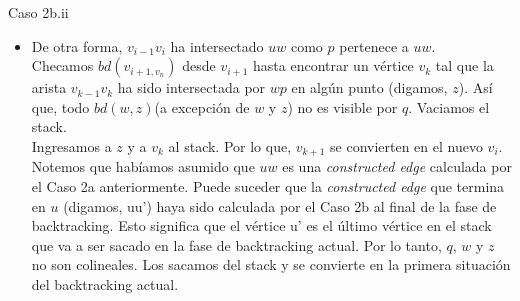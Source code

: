 \documentclass[aspectratio=169,xcolor=dvipsnames, t]{beamer}
\begin{document}
\begin{frame}{Caso 2b.ii}
    \begin{itemize}
        \small
        \item De otra forma, $v_{i-1}v_{i}$ ha intersectado $uw$ como $p$ pertenece a $uw$.\\
        \vspace{0.5cm}
        Checamos $bd(v_{i+1, v_{n}})$ desde $v_{i+1}$ hasta encontrar un vértice $v_{k}$ tal que la arista $v_{k-1}v_{k}$ ha sido intersectada por $wp$ en algún punto (digamos, $z$). Así que, todo $bd(w,z)$(a excepción de $w$ y $z$) no es visible por $q$. Vaciamos el stack.\\
        \vspace{0.5cm}
        Ingresamos a $z$ y a $v_{k}$ al stack. Por lo que, $v_{k+1}$ se convierten en el nuevo $v_{i}$. Notemos que habíamos asumido que $uw$ es una \textit{constructed edge} calculada por el Caso 2a anteriormente. Puede suceder que la \textit{constructed edge} que termina en $u$ (digamos, uu’) haya sido calculada por el Caso 2b al final de la fase de backtracking. Esto significa que el vértice u’ es el último vértice en el stack que va a ser sacado en la fase de backtracking actual. Por lo tanto, $q$, $w$ y $z$ no son colineales. Los sacamos del stack y se convierte en la primera situación del backtracking actual.\\
    \end{itemize}
\end{frame}
\end{document}
